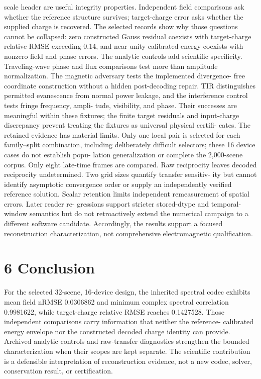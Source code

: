 \documentclass[11pt]{article}
\begin{document}
scale header are useful integrity properties. Independent field comparisons ask whether the reference
structure survives; target-charge error asks whether the supplied charge is recovered. The selected
records show why those questions cannot be collapsed: zero constructed Gauss residual coexists
with target-charge relative RMSE exceeding 0.14, and near-unity calibrated energy coexists with
nonzero field and phase errors.
The analytic controls add scientific specificity. Traveling-wave phase and flux comparisons test
more than amplitude normalization. The magnetic adversary tests the implemented divergence-
free coordinate construction without a hidden post-decoding repair. TIR distinguishes permitted
evanescence from normal power leakage, and the interference control tests fringe frequency, ampli-
tude, visibility, and phase. Their successes are meaningful within these fixtures; the finite target
residuals and input-charge discrepancy prevent treating the fixtures as universal physical certifi-
cates.
The retained evidence has material limits. Only one local pair is selected for each family–split
combination, including deliberately difficult selectors; these 16 device cases do not establish popu-
lation generalization or complete the 2,000-scene corpus. Only eight late-time frames are compared.
Raw reciprocity leaves decoded reciprocity undetermined. Two grid sizes quantify transfer sensitiv-
ity but cannot identify asymptotic convergence order or supply an independently verified reference
solution. Scalar retention limits independent remeasurement of spatial errors. Later reader re-
gressions support stricter stored-dtype and temporal-window semantics but do not retroactively
extend the numerical campaign to a different software candidate. Accordingly, the results support
a focused reconstruction characterization, not comprehensive electromagnetic qualification.

\section*{6 Conclusion}

For the selected 32-scene, 16-device design, the inherited spectral codec exhibits mean field nRMSE
0.0306862 and minimum complex spectral correlation 0.9981622, while target-charge relative RMSE
reaches 0.1427528. Those independent comparisons carry information that neither the reference-
calibrated energy envelope nor the constructed decoded charge identity can provide. Archived
analytic controls and raw-transfer diagnostics strengthen the bounded characterization when their
scopes are kept separate. The scientific contribution is a defensible interpretation of reconstruction
evidence, not a new codec, solver, conservation result, or certification.
\end{document}
